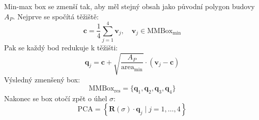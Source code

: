 Min-max box se zmenší tak, aby měl stejný obsah jako původní polygon budovy\( A_P \). Nejprve se spočítá těžiště:
\[
\mathbf{c} = \frac{1}{4} \sum_{j=1}^4 \mathbf{v}_j, \quad \mathbf{v}_j \in \text{MMBox}_{\min}
\]
Pak se každý bod redukuje k těžišti:
\begin{equation}
    \mathbf{q}_j = \mathbf{c} + \sqrt{\frac{A_P}{\text{area}_{\min}}} \cdot (\mathbf{v}_j - \mathbf{c})
\end{equation}
Výsledný zmenšený box:
\[
\text{MMBox}_{\text{res}} = \{ \mathbf{q}_1, \mathbf{q}_2, \mathbf{q}_3, \mathbf{q}_4 \}
\]
Nakonec se box otočí zpět o úhel \( \sigma \):
\begin{equation}
    \text{PCA} = \left\{ \mathbf{R}(\sigma) \cdot \mathbf{q}_j \mid j = 1,\dots,4 \right\}
\end{equation}
\newpage


